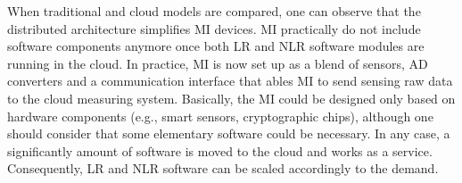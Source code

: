 \documentclass[journal]{IEEEtran} %
\begin{document}
When traditional and cloud models are compared, one can observe that the distributed architecture simplifies MI devices. MI practically do not include software components anymore once both LR and NLR software modules are running in the cloud. In practice, MI is now set up as a blend of sensors, AD converters and a communication interface that ables MI to send sensing raw data to the cloud measuring system. Basically, the MI could be designed only based on hardware components (e.g., smart sensors, cryptographic chips), although one should consider that some elementary software could be necessary. In any case, a significantly amount of software is moved to the cloud and works as a service. Consequently, LR and NLR software can be scaled accordingly to the demand.

\end{document}
